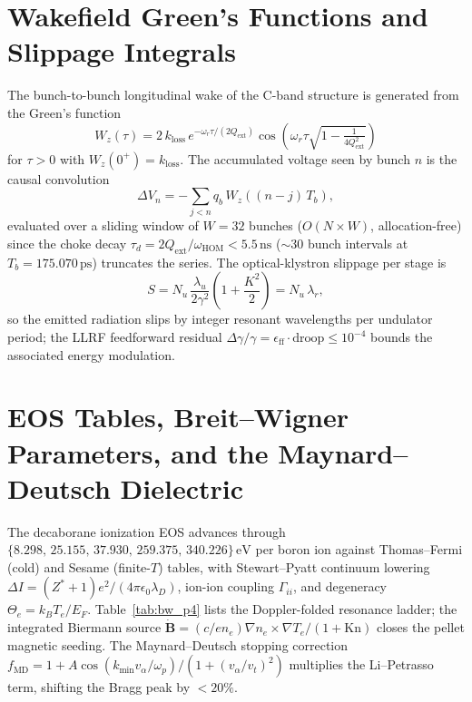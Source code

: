 \documentclass[10pt,journal,compsoc]{IEEEtran}
\begin{document}
\appendix
\section{Wakefield Green's Functions and Slippage Integrals}
\label{app:wakefields}
The bunch-to-bunch longitudinal wake of the C-band structure is
generated from the Green's function
\begin{equation}
W_z(\tau) = 2\,k_{\mathrm{loss}}\,e^{-\omega_r \tau / (2Q_{\mathrm{ext}})}
\cos\!\left(\omega_r\tau\sqrt{1-\tfrac{1}{4Q_{\mathrm{ext}}^2}}\right)
\end{equation}
for $\tau > 0$ with $W_z(0^{+}) = k_{\mathrm{loss}}$. The
accumulated voltage seen by bunch $n$ is the causal convolution
\begin{equation}
\Delta V_n = -\sum_{j < n} q_b\,W_z\!\left((n-j)\,T_b\right),
\end{equation}
evaluated over a sliding window of $W = 32$ bunches ($O(N\times W)$,
allocation-free) since the choke decay $\tau_d =
2Q_{\mathrm{ext}}/\omega_{\mathrm{HOM}} < 5.5\,\mathrm{ns}$ ($\sim$30
bunch intervals at $T_b = 175.070\,\mathrm{ps}$) truncates the
series. The optical-klystron slippage per stage is
\begin{equation}
S = N_u\,\frac{\lambda_u}{2\gamma^2}\left(1 + \frac{K^2}{2}\right)
= N_u\,\lambda_r,
\end{equation}
so the emitted radiation slips by integer resonant wavelengths per
undulator period; the LLRF feedforward residual
$\Delta\gamma/\gamma = \epsilon_{\mathrm{ff}}\cdot\mathrm{droop}
\le 10^{-4}$ bounds the associated energy modulation.

\section{EOS Tables, Breit--Wigner Parameters, and the
Maynard--Deutsch Dielectric}
\label{app:eos_bw}
The decaborane ionization EOS advances through
$\{8.298,\,25.155,\,37.930,\,259.375,\,340.226\}\,\mathrm{eV}$ per
boron ion against Thomas--Fermi (cold) and Sesame (finite-$T$)
tables, with Stewart--Pyatt continuum lowering
$\Delta I = (Z^{*}+1)e^{2}/(4\pi\epsilon_0\lambda_D)$, ion-ion
coupling $\Gamma_{ii}$, and degeneracy $\Theta_e = k_BT_e/E_F$.
Table~\ref{tab:bw_p4} lists the Doppler-folded resonance ladder;
the integrated Biermann source
$\dot{\mathbf{B}} = (c/en_e)\nabla n_e\times\nabla T_e/(1+\mathrm{Kn})$
closes the pellet magnetic seeding.
The Maynard--Deutsch stopping correction
$f_{\mathrm{MD}} = 1 + A\cos(k_{\min}v_\alpha/\omega_p)/
(1+(v_\alpha/v_t)^2)$ multiplies the Li--Petrasso term, shifting the
Bragg peak by $<20\%$.
\end{document}
